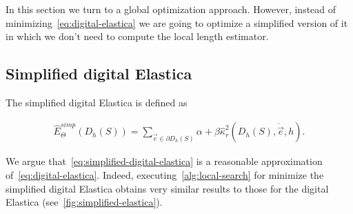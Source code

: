 In this section we turn to a global optimization approach. However, instead of minimizing~\cref{eq:digital-elastica} we are going to optimize a simplified version of it in which we don't need to compute the local length estimator.

\subsection{Simplified digital Elastica}
\label{ch6:subsec:simplified-digital-elastica}

The simplified digital Elastica is defined as

	\begin{align}
	\hat{E}_{\Theta}^{simp}( D_h(S) ) = \sum_{\dot{\vec{e}} \in \partial D_h(S)}{ \alpha + \beta \hat{\kappa}_{r}^2(D_h(S),\dot{\vec{e}},h) }.
	\label{eq:simplified-digital-elastica}
	\end{align}
	

We argue that~\cref{eq:simplified-digital-elastica} is a reasonable approximation of~\cref{eq:digital-elastica}. Indeed, executing~\cref{alg:local-search} for minimize the simplified digital Elastica obtains very similar results to those for the digital Elastica (see~\cref{fig:simplified-elastica}).


